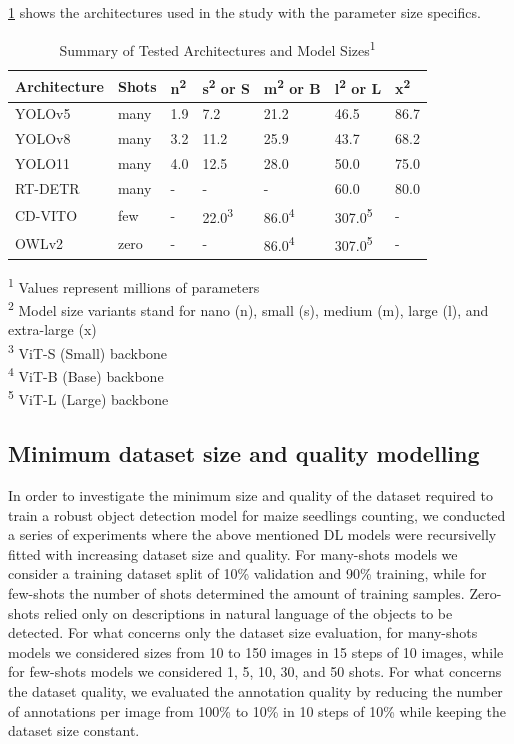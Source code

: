\documentclass[12pt,a4paper,oneside]{report}
\begin{document}
\cref{tab:architectures} shows the architectures used in the study 
with the parameter size specifics.

\begin{table}[H]
  \caption{Summary of Tested Architectures and Model Sizes\textsuperscript{1}}
  \label{tab:architectures}
  \centering
  \begin{tabularx}{\textwidth}{lXXXXXX}
  \toprule
  \textbf{Architecture} &\textbf{Shots} & \textbf{n\textsuperscript{2}} & \textbf{s\textsuperscript{2} or S} & \textbf{m\textsuperscript{2} or B} & \textbf{l\textsuperscript{2} or L} & \textbf{x\textsuperscript{2}} \\
  \midrule
  YOLOv5 & many & 1.9 & 7.2 & 21.2 & 46.5 & 86.7 \\
  YOLOv8 & many & 3.2 & 11.2 & 25.9 & 43.7 & 68.2 \\
  YOLO11 & many & 4.0 & 12.5 & 28.0 & 50.0 & 75.0 \\
  RT-DETR & many & - & - & - & 60.0 & 80.0 \\
  CD-VITO & few & - & 22.0\textsuperscript{3} & 86.0\textsuperscript{4} & 307.0\textsuperscript{5} & - \\
  OWLv2 & zero & - & - & 86.0\textsuperscript{4} & 307.0\textsuperscript{5} & - \\
  \bottomrule
  \end{tabularx}
  \footnotesize{\textsuperscript{1} Values represent millions of parameters\\
  \textsuperscript{2} Model size variants stand for nano (n), small (s), medium (m), large (l), and extra-large (x)\\
  \textsuperscript{3} ViT-S (Small) backbone\\
  \textsuperscript{4} ViT-B (Base) backbone\\
  \textsuperscript{5} ViT-L (Large) backbone}
\end{table}

\subsection{Minimum dataset size and quality modelling}
In order to investigate the minimum size and quality of the dataset required to train 
a robust object detection model for maize seedlings counting, we conducted a series of experiments
where the above mentioned DL models were recursivelly fitted with increasing dataset size and quality.
For many-shots models we consider a training 
dataset split of 10\% validation and 90\% training, while for few-shots the number of shots
determined the amount of training samples. Zero-shots relied only on descriptions 
in natural language of the objects to be detected.
For what concerns only the dataset size evaluation, for many-shots models we considered
sizes from 10 to 150 images in 15 steps of 10 images, while for few-shots models we considered
1, 5, 10, 30, and 50 shots.
For what concerns the dataset quality, we evaluated the annotation quality by reducing
the number of annotations per image from 100\% to 10\% in 10 steps of 10\% while
keeping the dataset size constant.
\end{document}

